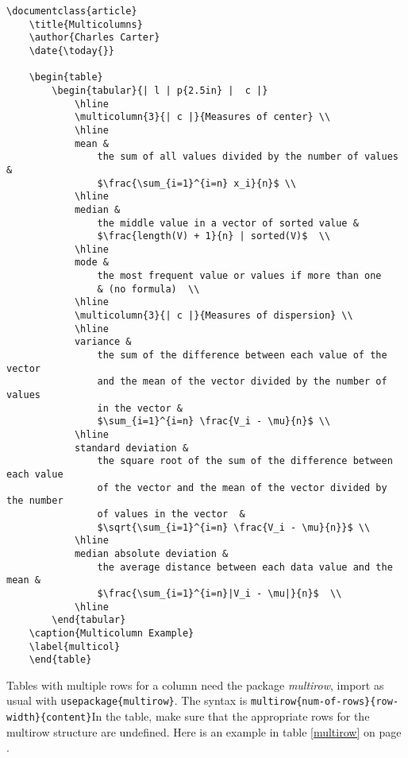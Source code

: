         \begin{verbatim}
\documentclass{article}
    \title{Multicolumns}
    \author{Charles Carter}
    \date{\today{}}
 
    \begin{table}
        \begin{tabular}{| l | p{2.5in} |  c |}
            \hline
            \multicolumn{3}{| c |}{Measures of center} \\
            \hline
            mean & 
                the sum of all values divided by the number of values & 
                $\frac{\sum_{i=1}^{i=n} x_i}{n}$ \\
            \hline
            median & 
                the middle value in a vector of sorted value & 
                $\frac{length(V) + 1}{n} | sorted(V)$  \\
            \hline
            mode & 
                the most frequent value or values if more than one  
                & (no formula)  \\
            \hline
            \multicolumn{3}{| c |}{Measures of dispersion} \\
            \hline
            variance & 
                the sum of the difference between each value of the vector 
                and the mean of the vector divided by the number of values 
                in the vector & 
                $\sum_{i=1}^{i=n} \frac{V_i - \mu}{n}$ \\
            \hline
            standard deviation & 
                the square root of the sum of the difference between each value 
                of the vector and the mean of the vector divided by the number 
                of values in the vector  & 
                $\sqrt{\sum_{i=1}^{i=n} \frac{V_i - \mu}{n}}$ \\
            \hline
            median absolute deviation & 
                the average distance between each data value and the mean & 
                $\frac{\sum_{i=1}^{i=n}|V_i - \mu|}{n}$  \\ 
            \hline
        \end{tabular}
    \caption{Multicolumn Example}
    \label{multicol}
    \end{table}

        \end{verbatim}

        Tables with multiple rows for a column need the package \textit{multirow}, import as usual with \texttt{usepackage\{multirow\}}. The syntax is \texttt{multirow\{num-of-rows\}\{row-width\}\{content\}}In the table, make sure that the appropriate rows for the multirow structure are undefined. Here is an example in table \ref{multirow} on page \pageref{multirow}.

